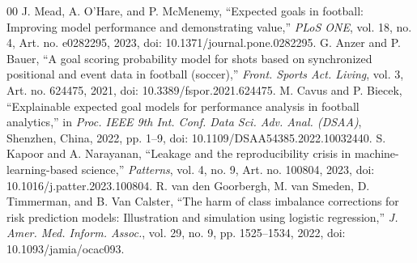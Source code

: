 \documentclass[conference]{IEEEtran}
\begin{document}
\begin{thebibliography}{00}
 J. Mead, A. O'Hare, and P. McMenemy, ``Expected goals in football: Improving model performance and demonstrating value,'' \textit{PLoS ONE}, vol. 18, no. 4, Art. no. e0282295, 2023, doi: 10.1371/journal.pone.0282295.
 G. Anzer and P. Bauer, ``A goal scoring probability model for shots based on synchronized positional and event data in football (soccer),'' \textit{Front. Sports Act. Living}, vol. 3, Art. no. 624475, 2021, doi: 10.3389/fspor.2021.624475.
 M. Cavus and P. Biecek, ``Explainable expected goal models for performance analysis in football analytics,'' in \textit{Proc. IEEE 9th Int. Conf. Data Sci. Adv. Anal. (DSAA)}, Shenzhen, China, 2022, pp. 1--9, doi: 10.1109/DSAA54385.2022.10032440.
 S. Kapoor and A. Narayanan, ``Leakage and the reproducibility crisis in machine-learning-based science,'' \textit{Patterns}, vol. 4, no. 9, Art. no. 100804, 2023, doi: 10.1016/j.patter.2023.100804.
 R. van den Goorbergh, M. van Smeden, D. Timmerman, and B. Van Calster, ``The harm of class imbalance corrections for risk prediction models: Illustration and simulation using logistic regression,'' \textit{J. Amer. Med. Inform. Assoc.}, vol. 29, no. 9, pp. 1525--1534, 2022, doi: 10.1093/jamia/ocac093.
\end{thebibliography}
\end{document}

